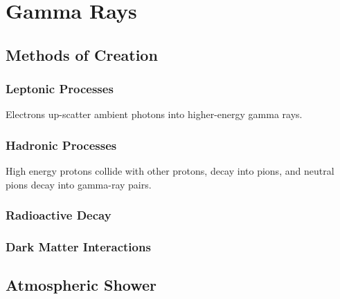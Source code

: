 \cleartooddpage[\thispagestyle{empty}]
\chapter{Gamma Rays}

\section{Methods of Creation}

\subsection{Leptonic Processes}
Electrons up-scatter ambient photons into higher-energy gamma rays.

\subsection{Hadronic Processes}
High energy protons collide with other protons, decay into pions, and neutral pions decay into gamma-ray pairs.

\subsection{Radioactive Decay}

\subsection{Dark Matter Interactions}

\section{Atmospheric Shower}


